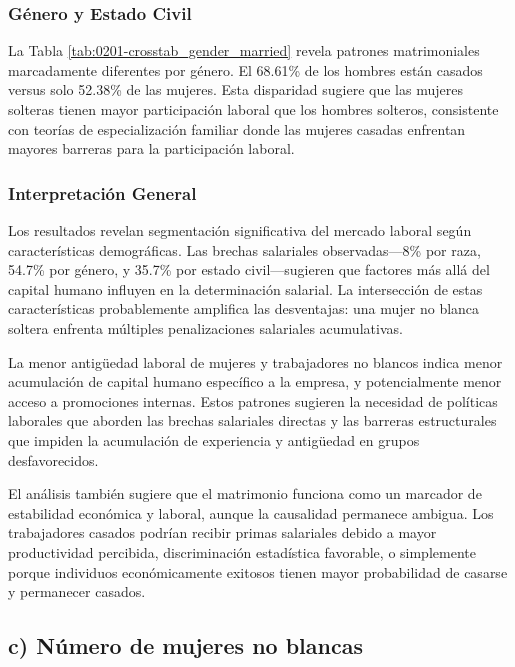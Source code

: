 \documentclass[12pt]{article}
\begin{document}
\subsubsection*{Género y Estado Civil}

La Tabla \ref{tab:0201-crosstab_gender_married} revela patrones matrimoniales marcadamente diferentes por género. El 68.61\% de los hombres están casados versus solo 52.38\% de las mujeres. Esta disparidad sugiere que las mujeres solteras tienen mayor participación laboral que los hombres solteros, consistente con teorías de especialización familiar donde las mujeres casadas enfrentan mayores barreras para la participación laboral.



\subsubsection*{Interpretación General}

Los resultados revelan segmentación significativa del mercado laboral según características demográficas. Las brechas salariales observadas—8\% por raza, 54.7\% por género, y 35.7\% por estado civil—sugieren que factores más allá del capital humano influyen en la determinación salarial. La intersección de estas características probablemente amplifica las desventajas: una mujer no blanca soltera enfrenta múltiples penalizaciones salariales acumulativas.

La menor antigüedad laboral de mujeres y trabajadores no blancos indica menor acumulación de capital humano específico a la empresa, y potencialmente menor acceso a promociones internas. Estos patrones sugieren la necesidad de políticas laborales que aborden las brechas salariales directas y las barreras estructurales que impiden la acumulación de experiencia y antigüedad en grupos desfavorecidos.

El análisis también sugiere que el matrimonio funciona como un marcador de estabilidad económica y laboral, aunque la causalidad permanece ambigua. Los trabajadores casados podrían recibir primas salariales debido a mayor productividad percibida, discriminación estadística favorable, o simplemente porque individuos económicamente exitosos tienen mayor probabilidad de casarse y permanecer casados.



\subsection*{c) Número de mujeres no blancas}
\end{document}
